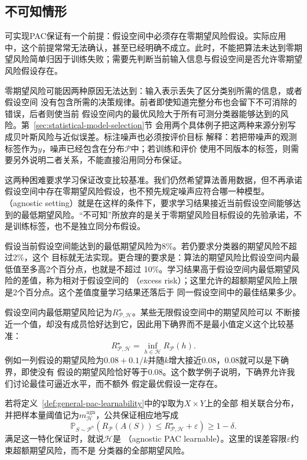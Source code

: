 \subsection{不可知情形}

可实现PAC保证有一个前提：假设空间中必须存在零期望风险假设。实际应用中，这个前提常常无法确认，甚至已经明确不成立。此时，不能把算法未达到零期望风险简单归因于训练失败；需要先判断当前输入信息与假设空间是否允许零期望风险假设存在。

零期望风险可能因两种原因无法达到：输入表示丢失了区分类别所需的信息，或者假设空间
没有包含所需的决策规律。前者即使知道完整分布也会留下不可消除的错误，后者则使当前
假设空间内的最优风险大于所有可测分类器能够达到的风险。第~\ref{sec:statistical-model-selection}节
会用两个具体例子把这两种来源分别写成贝叶斯风险与近似误差。标注噪声也必须按评价目标
解释：若把带噪声的观测标签作为$y$，噪声已经包含在分布$\mathcal P$中；若训练和评价
使用不同版本的标签，则需要另外说明二者关系，不能直接沿用同分布保证。

这两种困难要求学习保证改变比较基准。我们仍然希望算法善用数据，但不再承诺假设空间中存在零期望风险假设，也不预先规定噪声应符合哪一种模型。（agnostic setting）就是在这样的条件下，要求学习结果接近当前假设空间能够达到的最低期望风险。“不可知”所放弃的是关于零期望风险目标假设的先验承诺，不是训练标签，也不是独立同分布假设。

假设当前假设空间能达到的最低期望风险为8\%。若仍要求分类器的期望风险不超过2\%，这个
目标就无法实现。更合理的要求是：算法的期望风险比假设空间内最低值至多高2个百分点，也就是不超过
10\%。学习结果高于假设空间内最低期望风险的差值，称为相对于假设空间的
（excess risk）；这里允许的超额期望风险上限是2个百分点。这个差值度量学习结果还落后于
同一假设空间中的最佳结果多少。

假设空间内最低期望风险记为$R_{\mathcal P,\mathcal H}^\star$。某些无限假设空间中的期望风险可以
不断接近一个值，却没有成员恰好达到它，因此用下确界而不是最小值定义这个比较基准：
\begin{equation}
 R_{\mathcal P,\mathcal H}^\star=\inf_{h\in\mathcal H}R_{\mathcal P}(h).
 \label{eq:best-in-class-risk}
\end{equation}
例如一列假设的期望风险为$0.08+0.1/k$并随$k$增大接近0.08，0.08就可以是下确界，即使没有
假设的期望风险恰好等于0.08。这个数学例子说明，下确界允许我们讨论最佳可逼近水平，而不额外
假定最优假设一定存在。

若将定义~\ref{def:general-pac-learnability}中的$\mathfrak P$取为$X\times Y$上的全部
相关联合分布，并把样本量阈值记为$m_{\mathcal H}^{\mathrm{agn}}$，公共保证相应地写成
\begin{equation}
 \mathbb P_{S\sim\mathcal P^n}\left(
 R_{\mathcal P}(A(S))\leq R_{\mathcal P,\mathcal H}^\star+\varepsilon
 \right)\geq1-\delta.
 \label{eq:agnostic-pac-guarantee}
\end{equation}
满足这一特化保证时，就说$\mathcal H$是
（agnostic PAC learnable）。这里的误差容限$\varepsilon$约束超额期望风险，而不是
分类器的全部期望风险。

